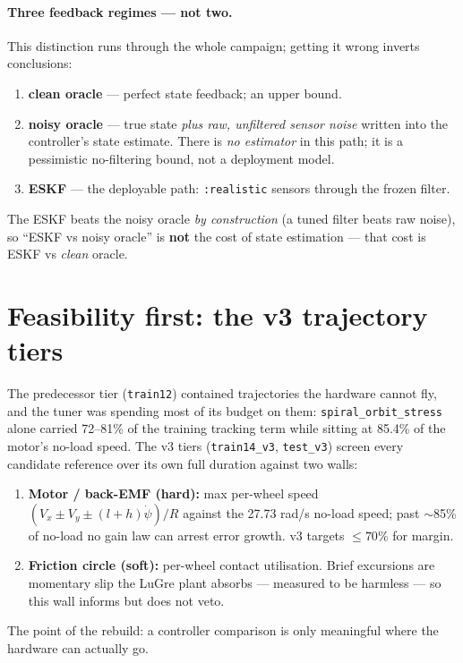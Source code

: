\documentclass[11pt]{article}
\begin{document}
\paragraph{Three feedback regimes --- not two.} This distinction runs through the whole
campaign; getting it wrong inverts conclusions:
\begin{enumerate}[nosep]
\item \textbf{clean oracle} --- perfect state feedback; an upper bound.
\item \textbf{noisy oracle} --- true state \emph{plus raw, unfiltered sensor noise}
      written into the controller's state estimate. There is \emph{no estimator} in this
      path; it is a pessimistic no-filtering bound, not a deployment model.
\item \textbf{ESKF} --- the deployable path: \texttt{:realistic} sensors through the
      frozen filter.
\end{enumerate}
The ESKF beats the noisy oracle \emph{by construction} (a tuned filter beats raw noise),
so ``ESKF vs noisy oracle'' is \textbf{not} the cost of state estimation --- that cost is
ESKF vs \emph{clean} oracle.

\section{Feasibility first: the v3 trajectory tiers}
The predecessor tier (\texttt{train12}) contained trajectories the hardware cannot fly,
and the tuner was spending most of its budget on them: \texttt{spiral\_orbit\_stress}
alone carried 72--81\% of the training tracking term while sitting at 85.4\% of the
motor's no-load speed. The v3 tiers (\texttt{train14\_v3}, \texttt{test\_v3}) screen
every candidate reference over its own full duration against two walls:
\begin{enumerate}[nosep]
\item \textbf{Motor / back-EMF (hard):} max per-wheel speed $(V_x\pm V_y\pm
(l{+}h)\dot\psi)/R$ against the 27.73 rad/s no-load speed; past $\sim$85\% of no-load no
gain law can arrest error growth. v3 targets $\le70\%$ for margin.
\item \textbf{Friction circle (soft):} per-wheel contact utilisation. Brief excursions
are momentary slip the LuGre plant absorbs --- measured to be harmless --- so this wall
informs but does not veto.
\end{enumerate}
The point of the rebuild: a controller comparison is only meaningful where the hardware
can actually go.
\end{document}
